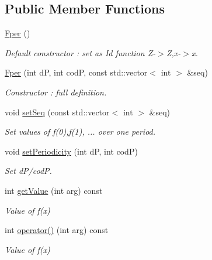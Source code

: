 \subsection*{Public Member Functions}
\begin{DoxyCompactItemize}
\item 
\mbox{\label{classetvo_i_i_1_1_fper_a2b0046c77b0d8566e0e8a405c06e4c0c}} 
\mbox{\hyperlink{classetvo_i_i_1_1_fper_a2b0046c77b0d8566e0e8a405c06e4c0c}{Fper}} ()
\begin{DoxyCompactList}\small\item\em Default constructor \+: set as Id function Z-\/$>$Z,x-\/$>$x. \end{DoxyCompactList}\item 
\mbox{\hyperlink{classetvo_i_i_1_1_fper_ae12f6a9faf9cd619437b92e9aee41874}{Fper}} (int dP, int codP, const std\+::vector$<$ int $>$ \&seq)
\begin{DoxyCompactList}\small\item\em Constructor \+: full definition. \end{DoxyCompactList}\item 
void \mbox{\hyperlink{classetvo_i_i_1_1_fper_a36fd97d564817c9dbcf345ce18f92219}{set\+Seq}} (const std\+::vector$<$ int $>$ \&seq)
\begin{DoxyCompactList}\small\item\em Set values of f(0),f(1), ... over one period. \end{DoxyCompactList}\item 
void \mbox{\hyperlink{classetvo_i_i_1_1_fper_ad7664e69a14929469b201ef3511f0a32}{set\+Periodicity}} (int dP, int codP)
\begin{DoxyCompactList}\small\item\em Set d\+P/codP. \end{DoxyCompactList}\item 
int \mbox{\hyperlink{classetvo_i_i_1_1_fper_a4a9e4e5907c291501be4919fd15d60c6}{get\+Value}} (int arg) const
\begin{DoxyCompactList}\small\item\em Value of f(x) \end{DoxyCompactList}\item 
int \mbox{\hyperlink{classetvo_i_i_1_1_fper_a4d81e27d0d456a1ab086460363d0132f}{operator()}} (int arg) const
\begin{DoxyCompactList}\small\item\em Value of f(x) \end{DoxyCompactList}\item 

\end{DoxyCompactItemize}
